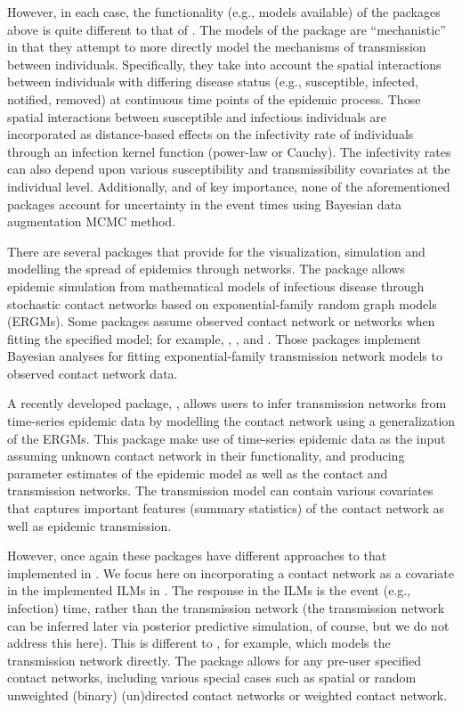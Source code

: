 \documentclass[nojss,shortnames]{jss}
\begin{document}
However, in each case, the functionality (e.g., models available) of the packages above is quite different to that of . The models of the  package are ``mechanistic'' in that they attempt to more directly model the mechanisms of transmission between individuals.
Specifically, they take into account the spatial interactions between individuals with differing disease status (e.g., susceptible, infected, notified, removed) at continuous time points of the epidemic process. Those spatial interactions between susceptible and infectious individuals are incorporated as distance-based effects on the infectivity rate of individuals through an infection kernel function (power-law or Cauchy). The infectivity rates can also depend upon various susceptibility and transmissibility covariates at the individual level. 
Additionally, and of key importance, none of the aforementioned packages account for uncertainty in the event times using Bayesian data augmentation MCMC method.

There are several  packages that provide for the visualization, simulation and modelling the spread of epidemics through networks. 
The package  \citep{EpiModel} allows epidemic simulation from mathematical models of infectious disease through stochastic contact networks based on exponential-family random graph models (ERGMs). 
Some packages assume observed contact network or networks when fitting the specified model; for example,  \citep{ergm1,ergm2},  \citep{Bergm1}, and  \citep{hergm}. Those packages implement Bayesian analyses for fitting exponential-family transmission network models to observed contact network data. 

A recently developed package,  \citep{epinet2}, allows users to infer transmission networks from time-series epidemic data by modelling the contact network using a generalization of the ERGMs.
This package make use of time-series epidemic data as the input assuming unknown contact network in their functionality, and producing parameter estimates of the epidemic model as well as the contact and transmission networks. The transmission model can contain various covariates that captures important features (summary statistics) of the contact network as well as epidemic transmission.

However, once again these packages have different approaches to that implemented in . We focus here on incorporating a contact network as a covariate in the implemented ILMs in . The response in the ILMs is the event (e.g., infection) time, rather than the transmission network (the transmission network can be inferred later via posterior  predictive simulation, of course, but we do not address this here).
This is different to , for example, which models the transmission network directly. 
The  package allows for any pre-user specified contact networks, including various special cases such as spatial or random unweighted (binary) (un)directed contact networks or weighted contact network.  
\end{document}
